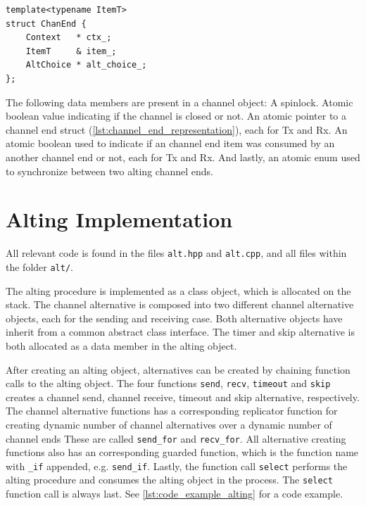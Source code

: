 \begin{lstfloat}
\begin{lstlisting}[caption={Channel end representation in channel object.}, label={lst:channel_end_representation}, style={CustomC++}, xleftmargin={4em}]
template<typename ItemT>
struct ChanEnd {
    Context   * ctx_;
    ItemT     & item_;
    AltChoice * alt_choice_;
};
\end{lstlisting}
\end{lstfloat}

The following data members are present in a channel object: A spinlock. Atomic boolean value indicating if the channel is closed or not. An atomic pointer to a channel end struct (\cref{lst:channel_end_representation}), each for Tx and Rx. An atomic boolean used to indicate if an channel end item was consumed by an another channel end or not, each for Tx and Rx. And lastly, an atomic enum used to synchronize between two alting channel ends.

\section{Alting Implementation}

All relevant code is found in the files \texttt{alt.hpp} and \texttt{alt.cpp}, and all files within the folder \texttt{alt/}.

The alting procedure is implemented as a class object, which is allocated on the stack. The channel alternative is composed into two different channel alternative objects, each for the sending and receiving case. Both alternative objects have inherit from a common abstract class interface. The timer and skip alternative is both allocated as a data member in the alting object. 

After creating an alting object, alternatives can be created by chaining function calls to the alting object. The four functions \texttt{send}, \texttt{recv}, \texttt{timeout} and \texttt{skip} creates a channel send, channel receive, timeout and skip alternative, respectively. The channel alternative functions has a corresponding replicator function for creating dynamic number of channel alternatives over a dynamic number of channel ends These are called \texttt{send\_for} and \texttt{recv\_for}. All alternative creating functions also has an corresponding guarded function, which is the function name with \texttt{\_if} appended, e.g. \texttt{send\_if}. Lastly, the function call \texttt{select} performs the alting procedure and consumes the alting object in the process. The \texttt{select} function call is always last. See \cref{lst:code_example_alting} for a code example.

